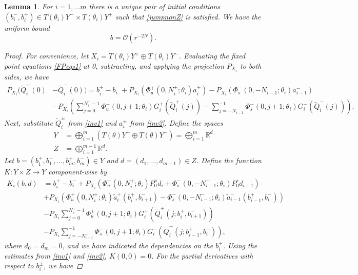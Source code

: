 \documentclass[12pt]{elsarticle}
\def\R{{\mathbb R}}
\newtheorem{lemma}{Lemma}
\begin{document}
\begin{lemma}\label{inv3nt}
For $i = 1, \dots m$ there is a unique pair of initial conditions $(b_i^-, b_i^+) \in T(\theta_i) Y^- \times T(\theta_i) Y^+$ such that \cref{jumpnonZ} is satisfied. We have the uniform bound
\begin{equation}\label{bboundnt}
b = \mathcal{O}(r^{-2N}).
\end{equation}

\begin{proof}
For convenience, let $X_i = T(\theta_i)Y^+ \oplus T(\theta_i)Y^-$. Evaluating the fixed point equations \cref{FPeqs1} at 0, subtracting, and applying the projection $P_{X_i}$ to both sides, we have 
\begin{align*}
P_{X_i}( \tilde{Q}_i^+(0) &- \tilde{Q}_i^-(0)) = b_i^+ - b_i^- 
+ P_{X_i}( \Phi_u^+(0, N_i^+; \theta_i) a_i^+) - P_{X_i}( \Phi_s^-(0, -N_{i-1}^-; \theta_i) a_{i-1}^-)  \\
&- P_{X_i} \left( \sum_{j = 0}^{N_i^+-1} \Phi_u^+(0, j+1; \theta_i) G_i^+(\tilde{Q}_i^+(j)) 
- \sum_{j = -N_{i-1}^-}^{-1} \Phi_s^-(0, j+1; \theta_i) G_i^-(\tilde{Q}_i^-(j)) \right) .
\end{align*}
Next, substitute $\tilde{Q}_i^\pm$ from \cref{inv1} and $a_i^\pm$ from \cref{inv2}. Define the spaces
\begin{align}\label{spaceYt}
Y &= \bigoplus_{i=1}^m (T(\theta) Y^+ \oplus T(\theta) Y^-) = \bigoplus_{i=1}^m \R^d \\
Z &= \bigoplus_{i=1}^{m-1} \R^d .
\end{align}
Let $b = (b_1^+, b_1^-, \dots, b_m^+, b_m^-) \in Y$ and $d = (d_1, \dots, d_{m-1}) \in Z$. Define the function $K: Y \times Z \rightarrow Y$ component-wise by
\begin{align*}
K_i(b, d) &= 
 b_i^+ - b_i^- + P_{X_i} \left( \Phi_u^+(0, N_i^+; \theta_i) P_0^u d_i + \Phi_s^-(0, -N_{i-1}^-; \theta_i) P_0^s d_{i-1} \right) \\
&+ P_{X_i}\left( \Phi_u^+(0, N_i^+; \theta_i) \tilde{a}_i^+(b_i^+, b_{i+1}^-) 
- \Phi_s^-(0, -N_{i-1}^-; \theta_i) \tilde{a}_{i-1}^-(b_{i-1}^+, b_i^-) \right) \\
&- P_{X_i} \sum_{j = 0}^{N_i^+-1} \Phi_u^+(0, j+1; \theta_i) G_i^+(\tilde{Q}_i^+(j; b_i^+, b_{i+1}^-)) \\
&- P_{X_i} \sum_{j = -N_{i-1}^-}^{-1} \Phi_s^-(0, j+1; \theta_i) G_i^-(\tilde{Q}_i^-(j; b_{i-1}^+, b_i^-)),
\end{align*}
where $d_0 = d_m = 0$, and we have indicated the dependencies on the $b_i^\pm$. Using the estimates from \cref{inv1} and \cref{inv2}, $K(0, 0) = 0$. For the partial derivatives with respect to $b_i^\pm$, we have

\end{proof}
\end{lemma}
\end{document}
